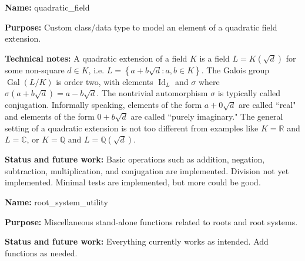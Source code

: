 \documentclass[12pt]{article}
\newcommand{\Q}{\mathbb{Q}}
\newcommand{\R}{\mathbb{R}}
\newcommand{\C}{\mathbb{C}}
\newcommand{\sig}{\sigma}
\newcommand{\lb}{\left\{}
\newcommand{\rb}{\right\}}
\newcommand{\tbf}{\textbf}
\DeclareMathOperator{\Gal}{Gal}
\DeclareMathOperator{\Id}{Id}
\begin{document}
\begin{mdframed}[linecolor=blue]
\tbf{Name:} quadratic\_field

\smallskip

\tbf{Purpose:} Custom class/data type to model an element of a quadratic field extension. 

\smallskip

\tbf{Technical notes:} A quadratic extension of a field $K$ is a field $L = K(\sqrt{d})$ for some non-square $d \in K$, i.e. $L = \lb a + b \sqrt{d} : a, b \in K \rb$. The Galois group $\Gal(L/K)$ is order two, with elements $\Id_L$ and $\sig$ where $\sig(a+b\sqrt{d}) = a - b \sqrt{d}$. The nontrivial automorphism $\sig$ is typically called conjugation. Informally speaking, elements of the form $a+0\sqrt{d}$ are called ``real" and elements of the form $0+b\sqrt{d}$ are called ``purely imaginary." The general setting of a quadratic extension is not too different from examples like $K=\R$ and $L = \C$, or $K = \Q$ and $L = \Q(\sqrt{d})$.

\smallskip

\tbf{Status and future work:} Basic operations such as addition, negation, subtraction, multiplication, and conjugation are implemented. Division not yet implemented. Minimal tests are implemented, but more could be good.

\end{mdframed}

\begin{mdframed}[linecolor=black]
\tbf{Name:} root\_system\_utility

\tbf{Purpose:} Miscellaneous stand-alone functions related to roots and root systems.

\tbf{Status and future work:} Everything currently works as intended. Add functions as needed.
\end{mdframed}

%
%

\newpage
\end{document}
